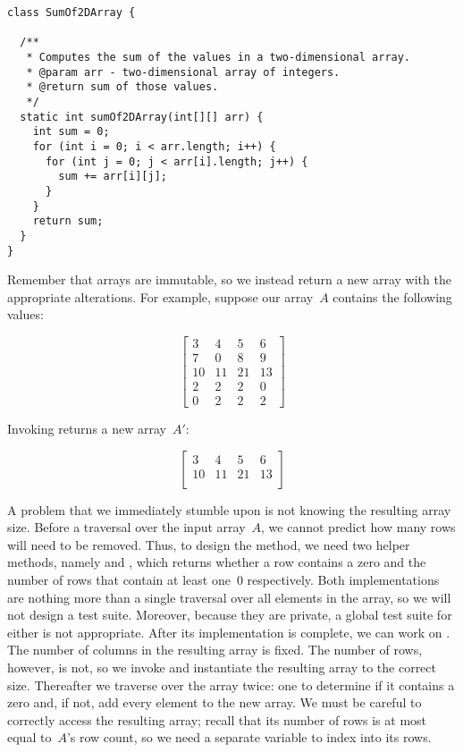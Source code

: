 \begin{lstlisting}[language=MyJava]
class SumOf2DArray {

  /**
   * Computes the sum of the values in a two-dimensional array.
   * @param arr - two-dimensional array of integers.
   * @return sum of those values.
   */
  static int sumOf2DArray(int[][] arr) {
    int sum = 0;
    for (int i = 0; i < arr.length; i++) {
      for (int j = 0; j < arr[i].length; j++) {
        sum += arr[i][j];
      }
    }
    return sum;
  }
}
\end{lstlisting}

Remember that arrays are immutable, so we instead return a new array with the appropriate alterations.
For example, suppose our array~$A$ contains the following values:

\[
\begin{bmatrix}
  3&4&5&6\\
  7&0&8&9\\
  10&11&21&13\\
  2&2&2&0\\
  0&2&2&2
\end{bmatrix}
\]

\noindent{}Invoking  returns a new array~$A'$:

\[
\begin{bmatrix}
  3&4&5&6\\
  10&11&21&13\\
\end{bmatrix}
\]

A problem that we immediately stumble upon is not knowing the resulting array size.
Before a traversal over the input array~$A$, we cannot predict how many rows will need to be removed.
Thus, to design the  method, we need two helper methods, namely  and , which returns whether a row contains a zero and the number of rows that contain at least one~$0$ respectively.
Both implementations are nothing more than a single traversal over all elements in the array, so we will not design a test suite.
Moreover, because they are private, a global test suite for either is not appropriate.
After its implementation is complete, we can work on . 
The number of columns in the resulting array is fixed.
The number of rows, however, is not, so we invoke  and instantiate the resulting array to the correct size.
Thereafter we traverse over the array twice: one to determine if it contains a zero and, if not, add every element to the new array.
We must be careful to correctly access the resulting array; recall that its number of rows is at most equal to~$A$'s row count, so we need a separate variable to index into its rows.

